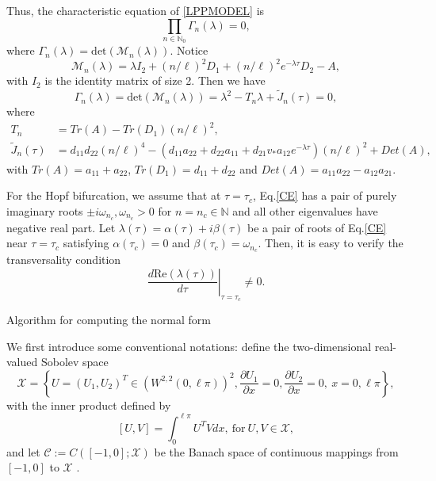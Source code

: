 \documentclass[11pt]{article}
\theoremstyle{definition}
\theoremstyle{remark}
\numberwithin{equation}{section}
\begin{document}
Thus, the characteristic equation of \eqref{LPPMODEL} is
\begin{equation}
\label{CE0}
\prod\limits_{n\in \mathbb{N}_0} \Gamma_n(\lambda)=0,
\end{equation}
where $\Gamma_n(\lambda)=\mathrm{det}\left(\mathcal{M}_n(\lambda)\right)$. Notice
\begin{equation}
\label{CEN}
\mathcal{M}_n(\lambda)=\lambda I_2+(n/\ell)^2D_1+(n/\ell)^2e^{-\lambda\tau}D_2-A,
\end{equation}
 with $I_2$ is the identity matrix of size 2.
Then we have
\begin{equation}
\label{CE}
\Gamma_n(\lambda)=\mathrm{det}\left(\mathcal{M}_n(\lambda)\right)=\lambda ^2-T_n\lambda+\widetilde{J}_n(\tau)=0,
\end{equation}
where
\begin{equation}
\label{TK}
\begin{split}
T_n&=Tr(A)-Tr(D_1)(n/\ell)^2,\\
\widetilde{J}_n(\tau)&=d_{11}d_{22} (n/\ell)^4
-\left(d_{11}a_{22}+d_{22}a_{11}+d_{21}v_*a_{12}e^{-\lambda\tau}\right) (n/\ell)^2+Det(A),
\end{split}\end{equation}
with $Tr(A)=a_{11}+a_{22}$,  $Tr(D_1)=d_{11}+d_{22}$ and  $Det(A)=a_{11}a_{22}-a_{12}a_{21}$.


For the Hopf bifurcation, we assume that  at $\tau=\tau_c$, Eq.\eqref{CE} has a pair of purely imaginary  roots $\pm i\omega_{n_c}, \omega_{n_c}>0$  for $n=n_c\in\mathbb{N}$  and all other eigenvalues  have negative real part.  Let
$\lambda(\tau)=\alpha(\tau)+i\beta(\tau)$ be a pair of roots of
Eq.\eqref{CE} near $\tau=\tau_c$ satisfying
$\alpha\left(\tau_c\right)=0$ and $\beta\left(\tau_c\right)=\omega_{n_c}$. Then, it is easy to verify  the transversality condition
 \[
 \left.\frac{d \mathrm{Re}(\lambda (\tau))}{d
\tau}\right|_{\tau=\tau_c}\neq 0.
\]
\begin{subsection}
   {Algorithm for computing the normal form}
 \end{subsection}

We first introduce some conventional notations: define the  two-dimensional real-valued Sobolev
space
\begin{equation*}
\mathscr{X}=\left\{U=\left(U_1, U_2\right)^T\in \left(W^{2,2}(0, \ell\pi)\right)^2,\frac{\partial U_1}{\partial
x}=0, \frac{\partial U_2}{\partial
x}=0,~ x=0, \ell\pi\right\},
\end{equation*}
with the inner product defined by
\begin{equation*}
\left[U, V \right]=\int_0^{\ell\pi}U^T V
dx, ~\mbox{for}~  U, V \in \mathscr{X},
\end{equation*}
and let  $\mathscr{C}:=C\left([-1,0]; \mathscr{X}\right)$ be the Banach space of continuous mappings from $[-1, 0]$ to $\mathscr{X}$ .
\end{document}
